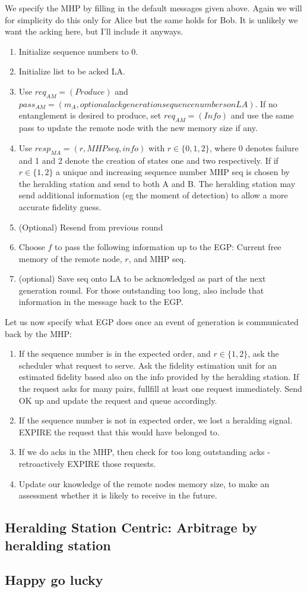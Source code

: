 \documentclass{article}
\begin{document}
We specify the MHP by filling in the default messages given above. Again we will for simplicity do this only for Alice but the same holds for Bob.
It is unlikely we want the acking here, but I'll include it anyways.
\begin{enumerate}
\item Initialize sequence numbers to 0.
\item Initialize list to be acked LA.
\item Use $req_{AM} = (Produce)$ and $pass_{AM} = (m_A, optional ack generation sequence numbers on LA)$. If no entanglement is desired to produce, set $req_{AM} = (Info)$ and use the same pass to update the remote node with the new memory size if any.
\item Use $resp_{MA} = (r, MHP seq, info)$ with $r \in \{0,1,2\}$, where 0 denotes 
failure and 1 and 2 denote the creation of states one and two respectively. If if $r \in \{1,2\}$ a unique and increasing sequence number MHP seq is chosen by the heralding station and send to both A and B. The heralding station may send additional information (eg the moment of detection) to allow a more accurate fidelity guess.
\item (Optional) Resend from previous round
\item Choose $f$ to pass the following information up to the EGP: Current free memory of the remote node, $r$, and MHP seq.
\item (optional) Save seq onto LA to be acknowledged as part of the next generation round. For those outstanding too long, also include that information in the message back to the EGP.
\end{enumerate}

Let us now specify what EGP does once an event of generation is communicated back by the MHP:
\begin{enumerate}
\item If the sequence number is in the expected order, and $r \in \{1,2\}$, ask the scheduler what request to serve. 
Ask the fidelity estimation unit for an estimated fidelity based also on the info provided by the heralding station. If the request asks for many
pairs, fullfill at least one request immediately. 
 Send OK up and update the request and queue accordingly.
\item If the sequence number is not in expected order, we lost a heralding signal. EXPIRE the request that this would have belonged to. 
\item If we do acks in the MHP, then check for too long outstanding acks - retroactively EXPIRE those requests.
\item Update our knowledge of the remote nodes memory size, to make an assessment whether it is likely to receive in the future.
\end{enumerate}

\subsection{Heralding Station Centric: Arbitrage by heralding station}

\subsection{Happy go lucky}
\end{document}

